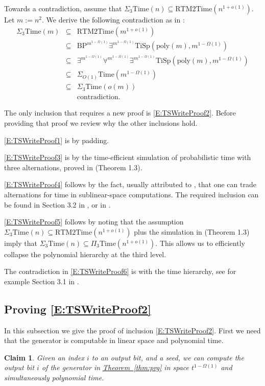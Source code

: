 \documentclass[11pt]{article}
\numberwithin{equation}{section}
\newtheorem{claim}[theorem]{Claim}
\theoremstyle{definition}
\theoremstyle{plain}
\newcommand{\expref}[2]{\hyperref[#2]{#1~\ref{#2}}}
\newcommand{\poly}{\mathrm{poly}}
\newcommand{\Timex}[1]{\ensuremath{\mathrm{Time} \left( #1 \right)}}
\newcommand{\TiSp}[2]{\ensuremath{\mathrm{TiSp} \left(#1,#2 \right)}}
\newcommand{\BP}[1]{\ensuremath{\mathrm{BP}^{#1}}}
\newcommand{\RTMTime}[1]{\ensuremath{\mathrm{RTM2Time} \left( #1 \right)}}
\begin{document}
Towards a contradiction, assume that $\Sigma_{3}\Timex{n}\subseteq\RTMTime{n^{1+o(1)}}$.
Let $m:=n^{2}$. We derive the following contradiction as in \cite{ViolaBPvsE}:
\begin{eqnarray}
\Sigma_{3}\Timex{m} & \subseteq & \RTMTime{m^{1+o(1)}}\label{E:TSWriteProof1}\\
 & \subseteq & \BP{m^{1-\Omega(1)}}\exists^{m^{1-\Omega(1)}}\TiSp{\poly(m)}{m^{1-\Omega(1)}}\label{E:TSWriteProof2}\\
 & \subseteq & \exists^{m^{1-\Omega(1)}}\forall^{m^{1-\Omega(1)}}\exists^{m^{1-\Omega(1)}}\TiSp{\poly(m)}{m^{1-\Omega(1)}}\label{E:TSWriteProof3}\\
 & \subseteq & \Sigma_{O(1)}\Timex{m^{1-\Omega(1)}}\label{E:TSWriteProof4}\\
 & \subseteq & \Sigma_{3}\Timex{o(m)}\label{E:TSWriteProof5}\\
 &  & \mathrm{contradiction.}\label{E:TSWriteProof6}
\end{eqnarray}

The only inclusion that requires a new proof is \eqref{E:TSWriteProof2}.
Before providing that proof we review why the other inclusions hold.

\eqref{E:TSWriteProof1} is by padding.

\eqref{E:TSWriteProof3} is by the time-efficient simulation of probabilistic
time with three alternations, proved in \cite{ViolaBPvsE} (Theorem
1.3).

\eqref{E:TSWriteProof4} follows by the fact, usually attributed to
\cite{Nep70}, that one can trade alternations for time in sublinear-space
computations. The required inclusion can be found in Section 3.2 in
\cite{vMe04}, or in \cite{FLvMV05}.

\eqref{E:TSWriteProof5} follows by noting that the assumption $\Sigma_{3}\Timex{n}\subseteq\RTMTime{n^{1+o(1)}}$
plus the simulation in \cite{ViolaBPvsE} (Theorem 1.3) imply that
$\Sigma_{3}\Timex{n}\subseteq\Pi_{3}\Timex{n^{1+o(1)}}$. This allows
us to efficiently collapse the polynomial hierarchy at the third level.

The contradiction in \eqref{E:TSWriteProof6} is with the time hierarchy,
see for example Section 3.1 in \cite{vMe04}.

\subsection{Proving \eqref{E:TSWriteProof2}}

In this subsection we give the proof of inclusion \eqref{E:TSWriteProof2}.
First we need that the generator is computable in linear space and
polynomial time.
\begin{claim}
\label{claim:G-small-space} Given an index $i$ to an output bit,
and a seed, we can compute the output bit $i$ of the generator in
\expref{Theorem}{thm:prg} in space $t^{1-\Omega(1)}$ and simultaneously
polynomial time.
\end{claim}
\end{document}
